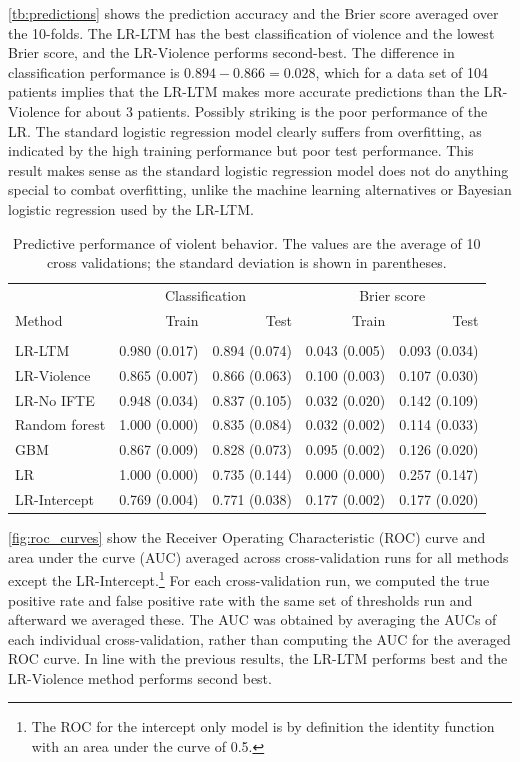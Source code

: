 \documentclass[a4paper,11pt]{article}
\begin{document}
\autoref{tb:predictions} shows the prediction accuracy and the Brier score averaged over the 10-folds.
The LR-LTM has the best classification of violence and the lowest Brier score, and the LR-Violence performs second-best.
The difference in classification performance is $0.894 - 0.866 = 0.028$, which for a data set of 104 patients implies that the LR-LTM makes more accurate predictions than the LR-Violence for about 3 patients.
Possibly striking is the poor performance of the LR.
The standard logistic regression model clearly suffers from overfitting, as indicated by the high training performance but poor test performance. This result makes sense as the standard logistic regression model does not do anything special to combat overfitting, unlike the machine learning alternatives or Bayesian logistic regression used by the LR-LTM.


\begin{table}[!ht]
    \caption{Predictive performance of violent behavior. The values are the average of 10 cross validations; the standard deviation is shown in parentheses.}
    \label{tb:predictions}
    \centering
    \begin{tabular}{lrrrr}
        \toprule
        & \multicolumn{2}{c}{Classification} & \multicolumn{2}{c}{Brier score}\\
        \cmidrule(lr){2-3}  \cmidrule(lr){4-5}
        Method & Train & Test & Train & Test \\
        \midrule \\
        LR-LTM & 0.980 (0.017) & 0.894 (0.074) & 0.043 (0.005) & 0.093 (0.034) \\
        LR-Violence & 0.865 (0.007) & 0.866 (0.063) & 0.100 (0.003) & 0.107 (0.030) \\
        LR-No IFTE & 0.948 (0.034) & 0.837 (0.105) & 0.032 (0.020) & 0.142 (0.109) \\
        Random forest & 1.000 (0.000) & 0.835 (0.084) & 0.032 (0.002) & 0.114 (0.033) \\
        GBM & 0.867 (0.009) & 0.828 (0.073) & 0.095 (0.002) & 0.126 (0.020) \\
        LR & 1.000 (0.000) & 0.735 (0.144) & 0.000 (0.000) & 0.257 (0.147) \\
        LR-Intercept & 0.769 (0.004) & 0.771 (0.038) & 0.177 (0.002) & 0.177 (0.020) \\
        \bottomrule
    \end{tabular}
\end{table}

\autoref{fig:roc_curves} show the Receiver Operating Characteristic (ROC) curve and area under the curve (AUC) averaged across cross-validation runs for all methods except the LR-Intercept.\footnote{The ROC for the intercept only model is by definition the identity function with an area under the curve of 0.5.}
For each cross-validation run, we computed the true positive rate and false positive rate with the same set of thresholds run and afterward we averaged these.
The AUC was obtained by averaging the AUCs of each individual cross-validation, rather than computing the AUC for the averaged ROC curve.
In line with the previous results, the LR-LTM performs best and the LR-Violence method performs second best.
\end{document}
